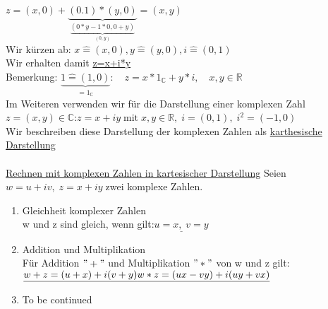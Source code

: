 \documentclass{article}
\begin{document}
$z=(x,0)+\underbrace{(0.1)\ast (y,0)}_{\underbrace{(0\ast y-1\ast 0,0+y)}_{(0,y)}}=(x,y)$\\
Wir kürzen ab: $x\widehat{=}(x,0), y\widehat{=}(y,0),i\widehat{=}(0,1)$\\
Wir erhalten damit \underline{z=x+i*y}\\
Bemerkung: $\underbrace{1\widehat{=}(1,0)}_{=1_{\mathbb{C}}}:\quad z=x\ast 1_{\mathbb{C}}+y\ast i,\quad x,y\in\mathbb{R}$\\
Im Weiteren verwenden wir für die Darstellung einer komplexen Zahl \\
$z=(x,y)\in\mathbb{C}$:\quad$z=x+iy\;\text{mit}\; x,y\in\mathbb{R},\; i=(0,1),\; i^{2}=(-1,0)$\\
Wir beschreiben diese Darstellung der komplexen Zahlen als \underline{karthesische Darstellung}\\
\\
\underline{Rechnen mit komplexen Zahlen in kartesischer Darstellung}
Seien $w=u+iv,\; z=x+iy\;$zwei komplexe Zahlen.
\begin{enumerate}
    \item Gleichheit komplexer Zahlen\\
          w und z sind gleich, wenn gilt:\quad$\underline{u=x,\; v=y}$\\
    \item Addition und Multiplikation\\
          Für Addition $"+"$ und Multiplikation $"\ast"$ von w und z gilt:\\
          $\underline{w+z=(u+x)+i(v+y)}\\
          \underline{w\ast z=(ux - vy)+i(uy+vx)}$
    \item To be continued
\end{enumerate}
\end{document}
